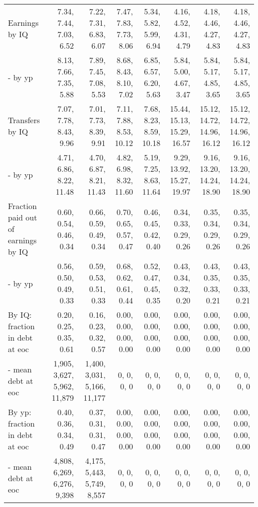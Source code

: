 \begin{tabular}{lrrrrrrr}
Earnings by IQ & 7.34, 7.44, 7.03, 6.52  & 7.22, 7.31, 6.83, 6.07  & 7.47, 7.83, 7.73, 8.06  & 5.34, 5.82, 5.99, 6.94  & 4.16, 4.52, 4.31, 4.79  & 4.18, 4.46, 4.27, 4.83  & 4.18, 4.46, 4.27, 4.83  \\ 
- by yp & 8.13, 7.66, 7.35, 5.88  & 7.89, 7.45, 7.08, 5.53  & 8.68, 8.43, 8.10, 7.02  & 6.85, 6.57, 6.20, 5.63  & 5.84, 5.00, 4.67, 3.47  & 5.84, 5.17, 4.85, 3.65  & 5.84, 5.17, 4.85, 3.65  \\ 
Transfers by IQ & 7.07, 7.78, 8.43, 9.96  & 7.01, 7.73, 8.39, 9.91  & 7.11, 7.88, 8.53, 10.12  & 7.68, 8.23, 8.59, 10.18  & 15.44, 15.13, 15.29, 16.57  & 15.12, 14.72, 14.96, 16.12  & 15.12, 14.72, 14.96, 16.12  \\ 
- by yp & 4.71, 6.86, 8.22, 11.48  & 4.70, 6.87, 8.21, 11.43  & 4.82, 6.98, 8.32, 11.60  & 5.19, 7.25, 8.63, 11.64  & 9.29, 13.92, 15.27, 19.97  & 9.16, 13.20, 14.24, 18.90  & 9.16, 13.20, 14.24, 18.90  \\ 
Fraction paid out of earnings by IQ & 0.60, 0.54, 0.46, 0.34  & 0.66, 0.59, 0.49, 0.34  & 0.70, 0.65, 0.57, 0.47  & 0.46, 0.45, 0.42, 0.40  & 0.34, 0.33, 0.29, 0.26  & 0.35, 0.34, 0.29, 0.26  & 0.35, 0.34, 0.29, 0.26  \\ 
- by yp & 0.56, 0.50, 0.49, 0.33  & 0.59, 0.53, 0.51, 0.33  & 0.68, 0.62, 0.61, 0.44  & 0.52, 0.47, 0.45, 0.35  & 0.43, 0.34, 0.32, 0.20  & 0.43, 0.35, 0.33, 0.21  & 0.43, 0.35, 0.33, 0.21  \\ 
By IQ: fraction in debt at eoc & 0.20, 0.25, 0.35, 0.61  & 0.16, 0.23, 0.32, 0.57  & 0.00, 0.00, 0.00, 0.00  & 0.00, 0.00, 0.00, 0.00  & 0.00, 0.00, 0.00, 0.00  & 0.00, 0.00, 0.00, 0.00  & 0.00, 0.00, 0.00, 0.00  \\ 
- mean debt at eoc & 1,905, 3,627, 5,962, 11,879  & 1,400, 3,031, 5,166, 11,177  & 0, 0, 0, 0  & 0, 0, 0, 0  & 0, 0, 0, 0  & 0, 0, 0, 0  & 0, 0, 0, 0  \\ 
By yp: fraction in debt at eoc & 0.40, 0.36, 0.34, 0.49  & 0.37, 0.31, 0.31, 0.47  & 0.00, 0.00, 0.00, 0.00  & 0.00, 0.00, 0.00, 0.00  & 0.00, 0.00, 0.00, 0.00  & 0.00, 0.00, 0.00, 0.00  & 0.00, 0.00, 0.00, 0.00  \\ 
- mean debt at eoc & 4,808, 6,269, 6,276, 9,398  & 4,175, 5,443, 5,749, 8,557  & 0, 0, 0, 0  & 0, 0, 0, 0  & 0, 0, 0, 0  & 0, 0, 0, 0  & 0, 0, 0, 0  \\ 
\hline
\end{tabular}%

